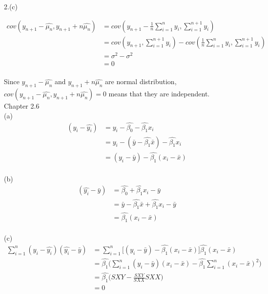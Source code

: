 \documentclass[fleqn]{article}
\begin{document}
2.(c)

\begin{equation*}
\begin{split}
cov(y_{n+1}-\hat{\mu_n}, y_{n+1}+n\hat{\mu_n}) &= cov(y_{n+1}-\frac{1}{n}\sum_{i=1}^{n}y_i, \sum_{i=1}^{n+1}y_i)\\
&= cov(y_{n+1}, \sum_{i=1}^{n+1}y_i) - cov(\frac{1}{n}\sum_{i=1}^{n}y_i, \sum_{i=1}^{n+1}y_i)\\
&= \sigma^2 - \sigma^2\\
&= 0
\end{split}
\end{equation*}\\

Since $y_{n+1} - \hat{\mu_n}$ and $y_{n+1}+n\hat{\mu_n} $ are normal distribution, $cov(y_{n+1} - \hat{\mu_n}, y_{n+1}+n\hat{\mu_n}) = 0$ means that they are independent. \\


Chapter 2.6\\

(a)\\

\begin{equation*}
\begin{split}
(y_i - \hat{y_i}) &= y_i - \hat{\beta_0} - \hat{\beta_1} x_i \\
&= y_i - (\bar{y} - \hat{\beta_1} \bar{x}) - \hat{\beta_1} x_i \\
&= (y_i - \bar{y}) - \hat{\beta_1} (x_i - \bar{x})
\end{split}
\end{equation*}\\



(b)\\

\begin{equation*}
\begin{split}
(\hat{y_i} - \bar{y}) &= \hat{\beta_0} + \hat{\beta_1} x_i - \bar{y} \\
&= \bar{y} - \hat{\beta_1} \bar{x} + \hat{\beta_1} x_i - \bar{y} \\
&= \hat{\beta_1}(x_i - \bar{x})
\end{split}
\end{equation*}\\



(c)\\

\begin{equation*}
\begin{split}
\sum_{i=1}^{n}(y_i - \hat{y_i})(\hat{y_i} - \bar{y}) &= \sum_{i=1}^{n}\big[(y_i - \bar{y}) - \hat{\beta_1} (x_i - \bar{x})\big] \hat{\beta_1}(x_i - \bar{x}) \\
&= \hat{\beta_1} \Big(\sum_{i=1}^{n} (y_i - \bar{y})(x_i - \bar{x}) - \hat{\beta_1} \sum_{i=1}^{n} (x_i - \bar{x})^2 \Big) \\
&= \hat{\beta_1} \Big(SXY - \frac{SXY}{SXX} SXX\Big) \\
&= 0
\end{split}
\end{equation*}
\end{document}
